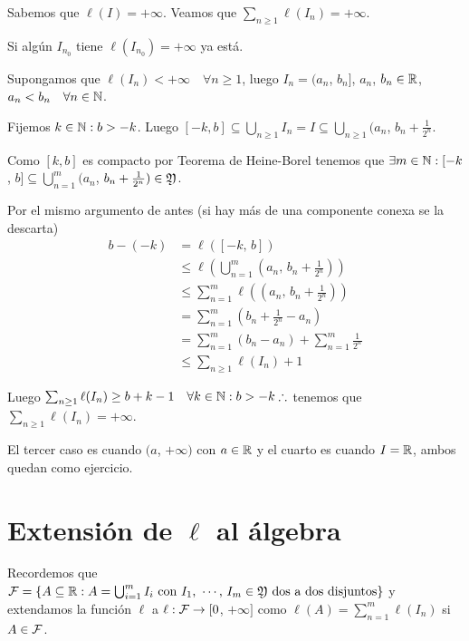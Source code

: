 Sabemos que $\ell(I) = +\infty$. Veamos que $\sum_{n \geq 1} \ell(I_n) = +\infty$.

Si algún $I_{n_0}$ tiene $\ell(I_{n_0}) = +\infty$ ya está.

Supongamos que $\ell(I_n) < +\infty \quad \forall n \geq 1$, luego $I_n = (a_n$, $b_n]$, $a_n$, $b_n \in \mathbb{R}$, $a_n < b_n \quad \forall n \in \mathbb{N}$.

Fijemos $k \in \mathbb{N} : b > -k$. Luego $[-k, b] \subseteq \bigcup_{n \geq 1} I_n = I \subseteq \bigcup_{n \geq 1} (a_n$, $b_n + \frac{1}{2^n}$.

Como $[k, b]$ es compacto por Teorema de Heine-Borel tenemos que $\exists m \in \mathbb{N} : [-k$, $b] \subseteq \bigcup_{n = 1}^m (a_n$, $b_n + \frac{1}{2^n}) \in \mathfrak{Y}$.

Por el mismo argumento de antes (si hay más de una componente conexa se la descarta) \begin{align*}
    b - (-k) & = \ell([-k \text{, } b])                                        \\
             & \leq \ell(\bigcup_{n = 1}^m (a_n\text{, } b_n + \frac{1}{2^n})) \\
             & \leq \sum_{n = 1}^m \ell((a_n\text{, } b_n + \frac{1}{2^n}))    \\
             & = \sum_{n = 1}^m (b_n + \frac{1}{2^n} - a_n)                    \\
             & = \sum_{n = 1}^m (b_n - a_n) + \sum_{n = 1}^m \frac{1}{2^n}     \\
             & \leq \sum_{n \geq 1} \ell(I_n) + 1
\end{align*}

Luego $\sum_{n \geq 1} \ell(I_n) \geq b + k - 1 \quad \forall k \in \mathbb{N} : b > -k \therefore$ tenemos que $\sum_{n \geq 1} \ell(I_n) = +\infty$.

El tercer caso es cuando $(a$, $+\infty)$ con $a \in \mathbb{R}$ y el cuarto es cuando $I = \mathbb{R}$, ambos quedan como ejercicio.

\section{Extensión de $\ell$ al álgebra}

Recordemos que $\mathcal{F} = \{ A \subseteq \mathbb{R} : A = \bigcup_{i = 1}^m I_i \text{ con } I_1 \text{, } \cdots \text{, } I_m \in \mathfrak{Y} \text{ dos a dos disjuntos} \}$ y extendamos la función
$\ell$ a $\ell: \mathcal{F} \to [0$, $+\infty]$ como $\ell(A) = \sum_{n = 1}^m \ell(I_n)$ si $A \in \mathcal{F}$.


